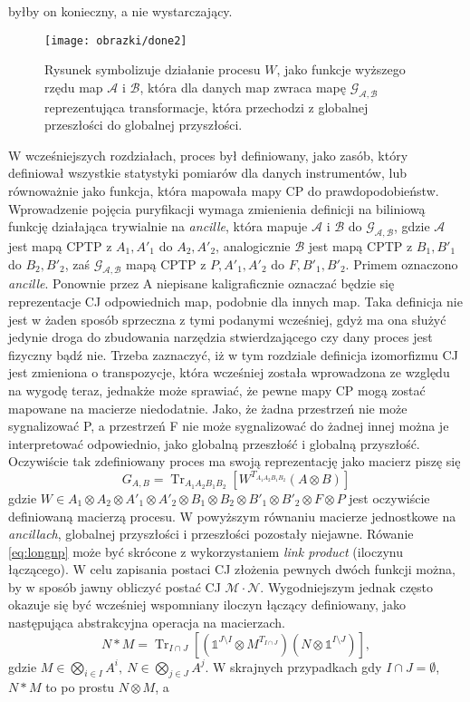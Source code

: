 \documentclass[10pt]{article} %
\DeclareMathOperator{\Trs}{Tr}
\newcommand{\I}{\mathbb{1}}
\begin{document}
byłby on konieczny, a nie wystarczający. 
\begin{figure}[t]
\centering
\texttt{[image: obrazki/done2]}
\caption{
Rysunek symbolizuje działanie procesu $W$, jako funkcje wyższego rzędu map $\mathcal{A}$ i $\mathcal{B}$, która dla danych map zwraca mapę 
$\mathcal{G_{A,B}}$ reprezentująca transformacje, która przechodzi z globalnej przeszłości do globalnej przyszłości.
}
\label{higherordermap}
\end{figure}
W wcześniejszych rozdziałach, proces był definiowany, jako zasób, który definiował wszystkie statystyki pomiarów dla danych instrumentów, lub równoważnie jako funkcja, która mapowała mapy CP do prawdopodobieństw. Wprowadzenie pojęcia puryfikacji wymaga zmienienia definicji na biliniową funkcję działająca trywialnie na \textit{ancille}, która mapuje
$\mathcal{A}$ i $\mathcal{B}$ do $\mathcal{G_{A,B}}$, gdzie $\mathcal{A}$ jest mapą CPTP z $A_1, A'_1$ do $A_2, A'_2$, analogicznie $\mathcal{B}$ jest mapą CPTP z
$B_1, B'_1$ do $B_2, B'_2$, zaś $\mathcal{G_{A,B}}$ mapą CPTP z $P, A'_1, A'_2$ do $F, B'_1, B'_2$. Primem oznaczono \textit{ancille}. Ponownie przez A niepisane kaligraficznie oznaczać będzie się reprezentacje CJ odpowiednich map, podobnie dla innych map. Taka definicja nie jest w żaden sposób sprzeczna z tymi podanymi wcześniej, gdyż ma ona służyć jedynie droga do zbudowania narzędzia stwierdzającego czy dany proces jest fizyczny bądź nie. Trzeba zaznaczyć, iż w tym rozdziale definicja izomorfizmu CJ jest zmieniona o transpozycje, która wcześniej została wprowadzona ze względu na wygodę teraz, jednakże może sprawiać, że pewne mapy CP 
mogą zostać mapowane na macierze niedodatnie. Jako, że żadna przestrzeń nie może sygnalizować P, a przestrzeń F nie może sygnalizować do żadnej innej
można je interpretować odpowiednio, jako globalną przeszłość i globalną przyszłość. Oczywiście tak zdefiniowany proces ma swoją reprezentację jako macierz piszę się
\begin{equation}
\label{eq:longnp}
G_{A,B} = \Trs_{A_1A_2B_1B_2} \left[ W^{T_{A_1A_2B_1B_2}} (A\otimes B)\right]
\end{equation}
gdzie $W \in A_1 \otimes A_2 \otimes A'_1 \otimes A'_2 \otimes B_1 \otimes B_2 \otimes B'_1 \otimes B'_2 \otimes F \otimes P$ jest oczywiście definiowaną macierzą procesu. W powyższym równaniu macierze jednostkowe na \textit{ancillach}, globalnej przyszłości i przeszłości pozostały niejawne.
Rówanie \eqref{eq:longnp} może być skrócone z wykorzystaniem \textit{link product} (iloczynu łączącego).
W celu zapisania postaci CJ złożenia pewnych dwóch funkcji można, by w sposób jawny obliczyć postać CJ $\mathcal{M} \cdot \mathcal{N}$. Wygodniejszym
jednak często okazuje się być wcześniej wspomniany iloczyn łączący definiowany, jako następująca abstrakcyjna operacja na macierzach.
\begin{equation}
N * M = \Trs_{I\cap J}\left[ (\I^{J\setminus I} \otimes M^{T_{I\cap J}})(N \otimes \I^{I\setminus J})\right],
\end{equation}
gdzie $M \in \bigotimes_{i \in I} A^i,~N \in \bigotimes_{j \in J} A^j$. W skrajnych przypadkach gdy $I \cap J = \emptyset$, $N*M$ to po prostu $N \otimes M$, a
\end{document}
